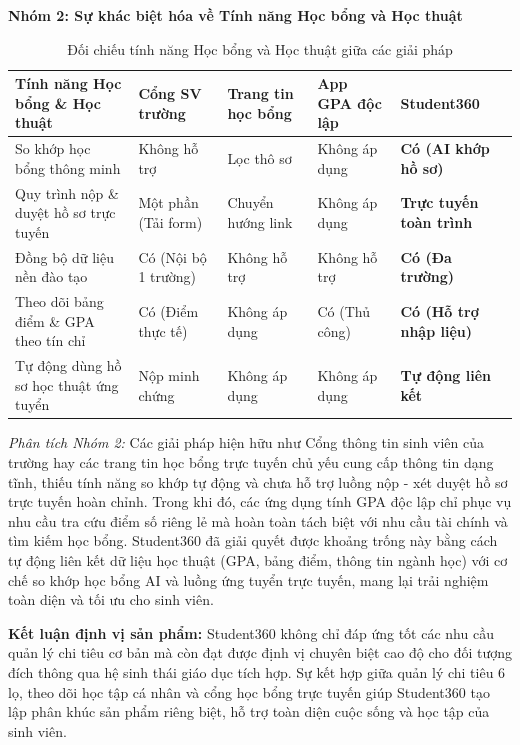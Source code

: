 \textbf{Nhóm 2: Sự khác biệt hóa về Tính năng Học bổng và Học thuật}

\begin{table}[H]
    \centering
    \begin{tabular}{|L{4.2cm}|C{2.6cm}|C{2.8cm}|C{2.8cm}|C{2.6cm}|}
        \hline
        \textbf{Tính năng Học bổng \& Học thuật} & \textbf{Cổng SV trường} & \textbf{Trang tin học bổng} & \textbf{App GPA độc lập} & \textbf{Student360} \\
        \hline
        So khớp học bổng thông minh & Không hỗ trợ & Lọc thô sơ & Không áp dụng & \textbf{Có (AI khớp hồ sơ)} \\ \hline
        Quy trình nộp \& duyệt hồ sơ trực tuyến & Một phần (Tải form) & Chuyển hướng link & Không áp dụng & \textbf{Trực tuyến toàn trình} \\ \hline
        Đồng bộ dữ liệu nền đào tạo & Có (Nội bộ 1 trường) & Không hỗ trợ & Không hỗ trợ & \textbf{Có (Đa trường)} \\ \hline
        Theo dõi bảng điểm \& GPA theo tín chỉ & Có (Điểm thực tế) & Không áp dụng & Có (Thủ công) & \textbf{Có (Hỗ trợ nhập liệu)} \\ \hline
        Tự động dùng hồ sơ học thuật ứng tuyển & Nộp minh chứng & Không áp dụng & Không áp dụng & \textbf{Tự động liên kết} \\ \hline
    \end{tabular}

    \caption{Đối chiếu tính năng Học bổng và Học thuật giữa các giải pháp}
    \label{tab:comparison-education}
\end{table}

\textit{Phân tích Nhóm 2:} Các giải pháp hiện hữu như Cổng thông tin sinh viên của trường hay các trang tin học bổng trực tuyến chủ yếu cung cấp thông tin dạng tĩnh, thiếu tính năng so khớp tự động và chưa hỗ trợ luồng nộp - xét duyệt hồ sơ trực tuyến hoàn chỉnh. Trong khi đó, các ứng dụng tính GPA độc lập chỉ phục vụ nhu cầu tra cứu điểm số riêng lẻ mà hoàn toàn tách biệt với nhu cầu tài chính và tìm kiếm học bổng. Student360 đã giải quyết được khoảng trống này bằng cách tự động liên kết dữ liệu học thuật (GPA, bảng điểm, thông tin ngành học) với cơ chế so khớp học bổng AI và luồng ứng tuyển trực tuyến, mang lại trải nghiệm toàn diện và tối ưu cho sinh viên.

\textbf{Kết luận định vị sản phẩm:} Student360 không chỉ đáp ứng tốt các nhu cầu quản lý chi tiêu cơ bản mà còn đạt được định vị chuyên biệt cao độ cho đối tượng đích thông qua hệ sinh thái giáo dục tích hợp. Sự kết hợp giữa quản lý chi tiêu 6 lọ, theo dõi học tập cá nhân và cổng học bổng trực tuyến giúp Student360 tạo lập phân khúc sản phẩm riêng biệt, hỗ trợ toàn diện cuộc sống và học tập của sinh viên.

